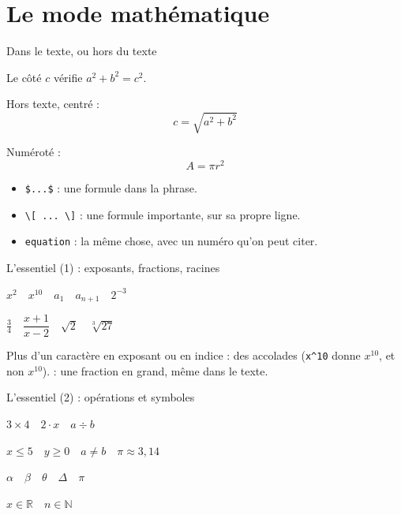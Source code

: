 \section{Le mode mathématique}

\begin{frame}[fragile]{Dans le texte, ou hors du texte}
\begin{CodeRendu}[title={Trois façons d'entrer en mode mathématique}]
Le côté $c$ vérifie $a^2 + b^2 = c^2$.

Hors texte, centré :
\[ c = \sqrt{a^2 + b^2} \]

Numéroté :
\begin{equation}
  A = \pi r^2
\end{equation}
\end{CodeRendu}
  \small
  \begin{itemize}
    \item \texttt{\$...\$} : une formule dans la phrase.
    \item \texttt{\textbackslash[ ... \textbackslash]} : une formule importante, sur sa
      propre ligne.
    \item \texttt{equation} : la même chose, avec un numéro qu'on peut citer.
  \end{itemize}
\end{frame}

\begin{frame}[fragile]{L'essentiel (1) : exposants, fractions, racines}
\begin{CodeRendu}[title={Exposants et indices}]
$x^2 \quad x^{10} \quad a_1
 \quad a_{n+1} \quad 2^{-3}$
\end{CodeRendu}
\begin{CodeRendu}[title={Fractions et racines}]
$\frac{3}{4} \quad \dfrac{x+1}{x-2}
 \quad \sqrt{2} \quad \sqrt[3]{27}$
\end{CodeRendu}
  \small Plus d'un caractère en exposant ou en indice : des accolades
  (\texttt{x\^{}10} donne $x^10$, et non $x^{10}$).  : une
  fraction en grand, même dans le texte.
\end{frame}

\begin{frame}[fragile]{L'essentiel (2) : opérations et symboles}
\begin{CodeRendu}[title={Opérations et relations}]
$3 \times 4 \quad 2 \cdot x \quad a \div b$

$x \leq 5 \quad y \geq 0 \quad a \neq b
 \quad \pi \approx 3{,}14$
\end{CodeRendu}
\begin{CodeRendu}[title={Lettres grecques et ensembles}]
$\alpha \quad \beta \quad \theta
 \quad \Delta \quad \pi$

$x \in \mathbb{R} \quad n \in \mathbb{N}$
\end{CodeRendu}
\end{frame}

